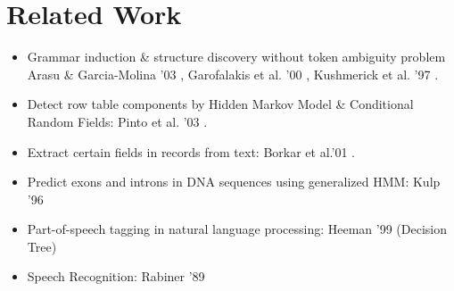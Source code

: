 \section{Related Work}\label{sec:related}

\begin{itemize}
\item Grammar induction \& structure discovery without token ambiguity problem
Arasu \& Garcia-Molina '03 \cite{arasu+:sigmod03},
Garofalakis et al. '00 \cite{garofalakis+:xtract},
Kushmerick et al. '97 \cite{kushmerick-phd1997}.

\item Detect row table components by Hidden Markov Model \& Conditional Random Fields:
Pinto et al. '03 \cite{Pinto+:texttables}.

\item  Extract certain fields in records from text:
Borkar et al.'01 \cite{borkar+:text-segmentation}.

\item Predict exons and introns in DNA sequences using generalized HMM:
Kulp '96 \cite{kulp96generalized}

\item  Part-of-speech tagging in natural language processing:
Heeman '99 (Decision Tree) \cite{Heeman99:speech}

\item Speech Recognition: Rabiner '89 \cite{rabiner89:hmm}

\end{itemize}
